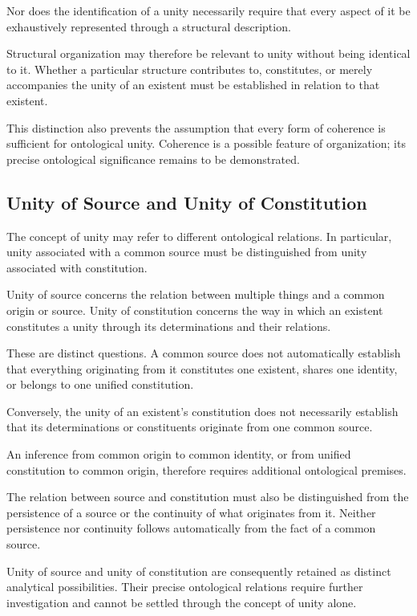 Nor does the identification of a unity
necessarily require that every aspect
of it be exhaustively represented
through a structural description.

Structural organization may therefore
be relevant to unity without being
identical to it. Whether a particular
structure contributes to, constitutes,
or merely accompanies the unity of
an existent must be established in
relation to that existent.

This distinction also prevents the
assumption that every form of coherence
is sufficient for ontological unity.
Coherence is a possible feature of
organization; its precise ontological
significance remains to be demonstrated.

\subsection{Unity of Source and Unity of Constitution}

The concept of unity may refer to
different ontological relations. In
particular, unity associated with a
common source must be distinguished
from unity associated with constitution.

Unity of source concerns the relation
between multiple things and a common
origin or source. Unity of constitution
concerns the way in which an existent
constitutes a unity through its
determinations and their relations.

These are distinct questions. A common
source does not automatically establish
that everything originating from it
constitutes one existent, shares one
identity, or belongs to one unified
constitution.

Conversely, the unity of an existent's
constitution does not necessarily
establish that its determinations or
constituents originate from one common
source.

An inference from common origin to
common identity, or from unified
constitution to common origin, therefore
requires additional ontological premises.

The relation between source and
constitution must also be distinguished
from the persistence of a source or
the continuity of what originates from
it. Neither persistence nor continuity
follows automatically from the fact
of a common source.

Unity of source and unity of constitution
are consequently retained as distinct
analytical possibilities. Their precise
ontological relations require further
investigation and cannot be settled
through the concept of unity alone.

